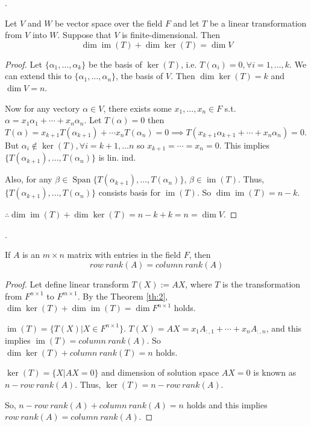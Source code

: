 \documentclass[8pt]{beamer}
\newcommand{\Span}{\operatorname{Span}}
\newcommand{\im}{\operatorname{im}}
\begin{document}
\begin{frame}{.}
    \begin{theorem}\label{th:2}
        Let $V$ and $W$ be vector space over the field $F$ and let $T$ be a linear transformation from $V$ into $W$. 
        Suppose that $V$ is finite-dimensional. 
        Then
        \[
            \dim \im(T) + \dim \ker(T) = \dim V 
        \]
    \end{theorem}

    \begin{proof}
    Let $\{\alpha_1 , \dots, \alpha_k\}$ be the basis of $\ker (T)$, i.e. $T(\alpha_i) = 0, \forall i=1, \dots, k$. We can extend this to $\{\alpha_1, \dots, \alpha_n\}$, the basis of $V$. Then $\dim \ker (T) =k$ and $\dim V =n$.

    \smallskip
    Now for any vectory $\alpha \in V$, there exists some $x_1, \dots, x_n \in F$ s.t. $\alpha = x_1 \alpha_1 + \cdots +  x_n \alpha_n$.
    Let $T(\alpha) = 0 $ then $T(\alpha) = x_{k+1} T(\alpha_{k+1}) + \cdots x_{n} T(\alpha_n) = 0 \implies T(x_{k+1} \alpha_{k+1} + \cdots + x_n \alpha_n) = 0$. But $\alpha_i \notin \ker (T), \forall i=k+1, \dots n$ so $x_{k+1} = \cdots = x_n = 0$. This implies $\{T(\alpha_{k+1}), \dots, T(\alpha_{n})\}$ is lin. ind.

    \smallskip
    Also, for any $\beta \in \Span \{ T(\alpha_{k+1}), \dots, T(\alpha_n)\}$, $\beta \in \im(T)$. Thus, $\{T(\alpha_{k+1}), \dots, T(\alpha_n)\}$ consists basis for $\im(T)$. So $\dim \im(T) = n -k$.

    $\therefore \dim \im(T) + \dim \ker (T) = n-k + k = n = \dim V$.
    \end{proof}
    
\end{frame}

\begin{frame}{.}
    \begin{theorem}
        If $A$ is an $m \times n$ matrix with entries in the field $F$, then
        \[
            row\ rank(A) = column\ rank(A)
        \]
    \end{theorem}
    \begin{proof}
        Let define linear transform $T(X):= AX$, where $T$ is the transformation from $F^{n \times 1}$ to $F^{m \times 1}$.
        By the Theorem \ref{th:2}, $\dim \ker(T) + \dim \im(T) = \dim F^{n \times 1}$ holds.

        \smallskip
        $\im(T) = \{T(X)| X \in F^{n\times 1}\}$. $T(X) = AX = x_1 A_{:, 1} + \cdots + x_n A_{:, n}$, and this implies $\im(T) = column\ rank(A)$. So $\dim \ker(T) + column\ rank (T) = n $ holds.

        \smallskip
        $\ker(T) = \{X|AX = 0 \}$ and dimension of solution space $AX =0$ is known as $n- row\ rank(A)$. Thus, $\ker(T) = n - row\ rank(A)$.

        \smallskip
        So, $n - row\ rank(A) + column\ rank(A) =n$ holds and this implies $row\ rank(A) = column\ rank(A)$.

    \end{proof}
\end{frame}
\end{document}
